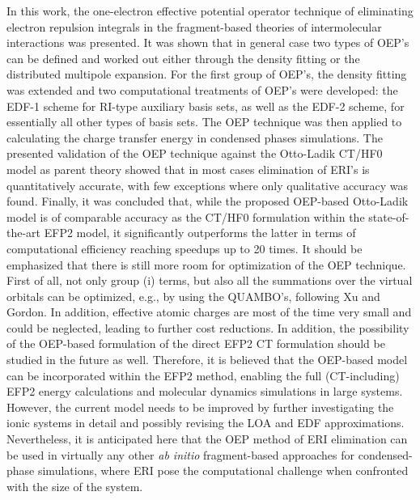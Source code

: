 \documentclass[aip,jcp,amsmath,amssymb,reprint,floatfix]{revtex4-1}
\begin{document}
In this work, the one\hyp{}electron effective potential operator technique
of eliminating electron repulsion integrals in the fragment\hyp{}based
theories of intermolecular interactions
was presented.
It was shown that in general case two types of OEP's
can be defined and worked out either through the density fitting or the distributed
multipole expansion. For the first group of OEP's, the density fitting was extended
and two computational treatments of OEP's were developed: the EDF-1 scheme
for RI\hyp{}type auxiliary basis sets, as well as the EDF-2 scheme, for
essentially all other types of basis sets. 
The OEP technique was then applied to calculating the charge transfer energy
in condensed phases simulations. 
The presented validation of the OEP technique
against the Otto\hyp{}Ladik CT/HF0 model as parent theory showed that in most cases
elimination of ERI's is quantitatively accurate, with few exceptions
where only qualitative accuracy was found. 
Finally, it was concluded that, while the proposed OEP\hyp{}based Otto\hyp{}Ladik
model is of comparable accuracy as the CT/HF0 formulation within the
state\hyp{}of\hyp{}the\hyp{}art EFP2 model, it significantly outperforms the latter
in terms of computational efficiency reaching speedups up to 20 times.
It should be emphasized that there is still more room for optimization of the
OEP technique. First of all, not only group (i) terms, but also
all the summations over the virtual orbitals can be optimized,
e.g., by using the QUAMBO's, following Xu and Gordon.\cite{Xu.Gordon.JCP.2013}
In addition, effective atomic charges are most of the time very small
and could be neglected, leading to further cost reductions.
In addition, the possibility of the OEP\hyp{}based formulation of the direct EFP2 CT formulation
should be studied in the future as well.
Therefore, it is believed that the OEP\hyp{}based
model can be incorporated within the EFP2 method, enabling
the full (CT\hyp{}including) EFP2 energy calculations and 
molecular dynamics simulations in large systems. However, the current model
needs to be improved by further investigating the ionic
systems in detail and possibly revising the LOA and EDF approximations.
Nevertheless,
it is anticipated here that the OEP method of ERI elimination can be used in 
virtually any other 
\emph{ab initio} fragment\hyp{}based
approaches for condensed\hyp{}phase simulations, where ERI pose the
computational challenge when confronted with the size of the system.
\end{document}
